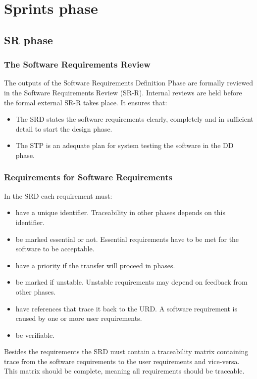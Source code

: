 \chapter{Sprints phase} \label{Sprints phase}

\section{SR phase}
\subsection{The Software Requirements Review}
The outputs of the Software Requirements Definition Phase are formally reviewed in the Software Requirements Review (SR-R). Internal reviews are held before the formal external SR-R takes place. It ensures that:
\begin{itemize}
	\item The SRD states the software requirements clearly, completely and in sufficient detail to start the design phase.
	\item The STP is an adequate plan for system testing the software in the DD phase.
\end{itemize}

\subsection{Requirements for Software Requirements}
In the SRD each requirement must:
\begin{itemize}
	\item have a unique identifier. Traceability in other phases depends on this identifier.
	\item be marked essential or not. Essential requirements have to be met for the software to be acceptable.
	\item have a priority if the transfer will proceed in phases.
	\item be marked if unstable. Unstable requirements may depend on feedback from other phases.
	\item have references that trace it back to the URD. A software requirement is caused by one or more user requirements.
	\item be verifiable.
\end{itemize}

Besides the requirements the SRD must contain a traceability matrix containing trace from the software requirements to the user requirements and vice-versa. This matrix should be complete, meaning all requirements should be traceable.

